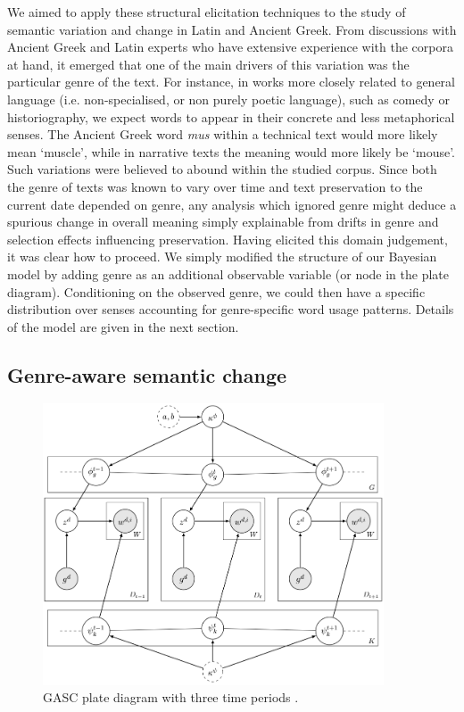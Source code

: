 \documentclass[output=paper]{langscibook}
\begin{document}
We aimed to apply these structural elicitation techniques to the study of semantic variation and change in Latin and Ancient Greek. From discussions with Ancient Greek and Latin experts who have extensive experience with the corpora at hand, it emerged that one of the main drivers of this variation was the particular genre of the text. For instance, in works more closely related to general language (i.e. non-specialised, or non purely poetic language), such as comedy or historiography, we expect words to appear in their concrete and less metaphorical senses. The Ancient Greek word \emph{mus} within a technical text would more likely mean `muscle', while in narrative texts the meaning would more likely be `mouse'. Such variations were believed to abound within the studied corpus. Since both the genre of texts was known to vary over time and text preservation to the current date depended on genre, any analysis which ignored genre might deduce a spurious change in overall meaning simply explainable from drifts in genre and selection effects influencing preservation. Having elicited this domain judgement, it was clear how to proceed. We simply modified the structure of our Bayesian model by adding genre as an additional observable variable (or node in
the plate diagram). Conditioning on the observed genre, we could then have a specific distribution over senses accounting for genre-specific word usage patterns. Details of the model are given in the next section. 


\subsection{Genre-aware semantic change}\label{sec:model}

\begin{figure}
\includegraphics[width=0.9\textwidth]{figures/PERRONE_plate_diagram.png}
\caption{GASC plate diagram with three time periods \citep{perrone-etal-2019-gasc}.}
\label{diagram}
\end{figure}
\end{document}
